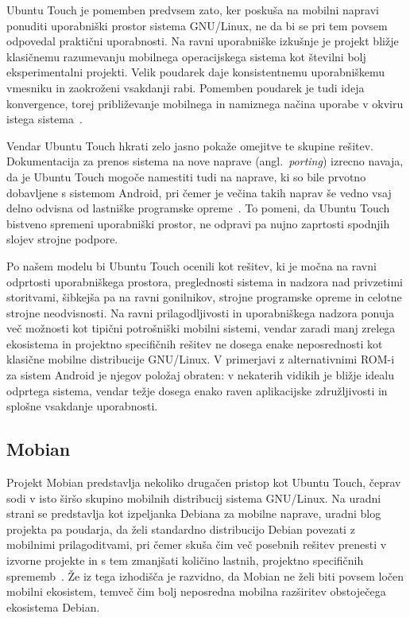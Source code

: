 \documentclass[a4paper,12pt,openright]{book}
\begin{document}
Ubuntu Touch je pomemben predvsem zato, ker poskuša na mobilni napravi ponuditi uporabniški prostor sistema GNU/Linux, ne da bi se pri tem povsem odpovedal praktični uporabnosti.
Na ravni uporabniške izkušnje je projekt bližje klasičnemu razumevanju mobilnega operacijskega sistema kot številni bolj eksperimentalni projekti.
Velik poudarek daje konsistentnemu uporabniškemu vmesniku in zaokroženi vsakdanji rabi.
Pomemben poudarek je tudi ideja konvergence, torej približevanje mobilnega in namiznega načina uporabe v okviru istega sistema~\cite{ubports_convergence}.

Vendar Ubuntu Touch hkrati zelo jasno pokaže omejitve te skupine rešitev.
Dokumentacija za prenos sistema na nove naprave (angl.~\textit{porting}) izrecno navaja, da je Ubuntu Touch mogoče namestiti tudi na naprave, ki so bile prvotno dobavljene s sistemom Android, pri čemer je večina takih naprav še vedno vsaj delno odvisna od lastniške programske opreme~\cite{ubports_porting_intro}.
To pomeni, da Ubuntu Touch bistveno spremeni uporabniški prostor, ne odpravi pa nujno zaprtosti spodnjih slojev strojne podpore.

Po našem modelu bi Ubuntu Touch ocenili kot rešitev, ki je močna na ravni odprtosti uporabniškega prostora, preglednosti sistema in nadzora nad privzetimi storitvami, šibkejša pa na ravni gonilnikov, strojne programske opreme in celotne strojne neodvisnosti.
Na ravni prilagodljivosti in uporabniškega nadzora ponuja več možnosti kot tipični potrošniški mobilni sistemi, vendar zaradi manj zrelega ekosistema in projektno specifičnih rešitev ne dosega enake neposrednosti kot klasične mobilne distribucije GNU/Linux.
V primerjavi z alternativnimi ROM-i za sistem Android je njegov položaj obraten:
v nekaterih vidikih je bližje idealu odprtega sistema, vendar težje dosega enako raven aplikacijske združljivosti in splošne vsakdanje uporabnosti.

\subsection{Mobian}

Projekt Mobian predstavlja nekoliko drugačen pristop kot Ubuntu Touch, čeprav sodi v isto širšo skupino mobilnih distribucij sistema GNU/Linux.
Na uradni strani se predstavlja kot izpeljanka Debiana za mobilne naprave, uradni blog projekta pa poudarja, da želi standardno distribucijo Debian povezati z mobilnimi prilagoditvami, pri čemer skuša čim več posebnih rešitev prenesti v izvorne projekte in s tem zmanjšati količino lastnih, projektno specifičnih sprememb~\cite{mobian_home,mobian_what_is}.
Že iz tega izhodišča je razvidno, da Mobian ne želi biti povsem ločen mobilni ekosistem, temveč čim bolj neposredna mobilna razširitev obstoječega ekosistema Debian.
\end{document}
